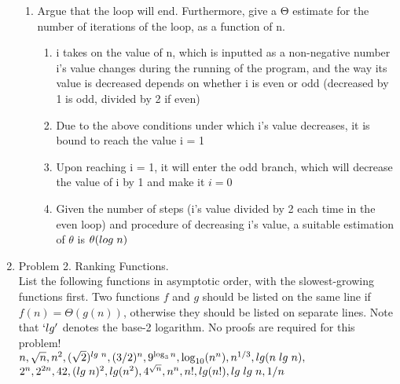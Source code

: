 \documentclass[11pt]{article}
\begin{document}
\begin{enumerate}
\begin{enumerate}
        \item Argue that the loop will end. Furthermore, give a Θ estimate for the number of iterations of the loop, as a function of n.
        \begin{enumerate}
            \item i takes on the value of n, which is inputted as a non-negative number\\
            i's value changes during the running of the program, and the way its value is decreased depends on whether i is even or odd (decreased by 1 is odd, divided by 2 if even)
            \item Due to the above conditions under which i's value decreases, it is bound to reach the value i = 1
            \item Upon reaching i = 1, it will enter the odd branch, which will decrease the value of i by 1 and make it $i = 0$
            \item Given the number of steps (i's value divided by 2 each time in the even loop) and procedure of decreasing i's value, a suitable estimation of $\theta$ is $\theta (log \hspace{0.1cm} n)$
        \end{enumerate}
        
    \end{enumerate}

\item Problem 2. Ranking Functions.\\
List the following functions in asymptotic order, with the slowest-growing functions first. Two functions $f$ and $g$ should be listed on the same line if $f(n)=Θ(g(n))$, otherwise they should be listed on separate lines. Note that $`lg'$ denotes the base-2 logarithm. No proofs are required for this problem!\\
\hspace{0.5cm}
$n, \sqrt{n}, n^2, (\sqrt2)^{lg \hspace{0.1 cm} n}, (3/2)^{n}, 9^{\log _{3} n}, \log _{10} (n^n), n^{1/3}, lg(n\hspace{0.1 cm} lg\hspace{0.1 cm}n),$ \\
$ 2^n, 2^{2n}, 42, (lg \hspace{0.1 cm}n)^2, lg (n^2), 4^{\sqrt{n}}, n^n, n!, lg(n!), lg \hspace{0.1cm}lg\hspace{0.1cm}n, 1/n$


\end{enumerate}
\end{document}
